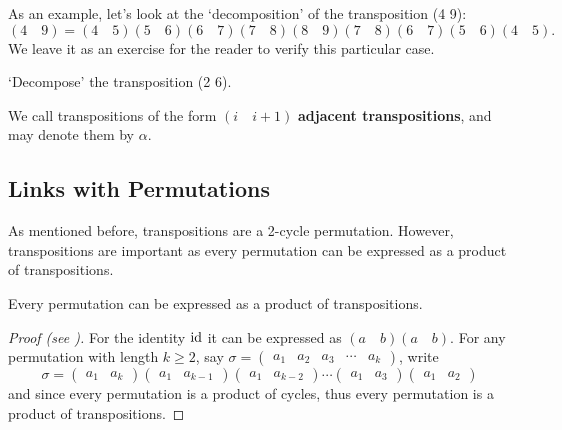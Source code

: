 \begin{example}
    As an example, let's look at the `decomposition' of the transposition (4 9):
    \[
        (4\quad 9) = (4\quad 5)(5\quad 6)(6\quad 7)(7\quad 8)(8\quad 9)(7\quad 8)(6\quad 7)(5\quad 6)(4\quad 5).
    \]
    We leave it as an exercise for the reader to verify this particular case.
\end{example}
\begin{exercise}
    `Decompose' the transposition (2 6).
\end{exercise}
\begin{remark}
    We call transpositions of the form $(i\quad i+1)$ \textbf{adjacent transpositions}, and may denote them by $\alpha$.
\end{remark}

\subsection{Links with Permutations}
As mentioned before, transpositions are a 2-cycle permutation. However, transpositions are important as every permutation can be expressed as a product of transpositions.
\begin{lemma}\label{lemma-permutations-as-product-of-transpositions}
    Every permutation can be expressed as a product of transpositions.
\end{lemma}
\begin{proof}[Proof (see {\cite[\S 80 Corollary]{clark_1984}})]
    For the identity $\mathrm{id}$ it can be expressed as $(a\quad b)(a \quad b)$. For any permutation with length $k \geq 2$, say $\sigma = \begin{pmatrix}a_1 & a_2 & a_3 & \cdots & a_k\end{pmatrix}$, write
    \[
        \sigma = \begin{pmatrix}a_1 & a_k\end{pmatrix}    \begin{pmatrix}a_1 & a_{k-1}\end{pmatrix}\begin{pmatrix}a_1 & a_{k-2}\end{pmatrix}\cdots\begin{pmatrix}a_1 & a_3\end{pmatrix}\begin{pmatrix}a_1 & a_2\end{pmatrix}
    \]
    and since every permutation is a product of cycles, thus every permutation is a product of transpositions.
\end{proof}

